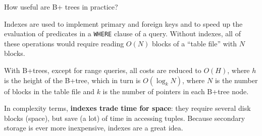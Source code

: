 %
%


%
%
\begin{frame}{How useful are B+ trees in practice?}

Indexes are used to implement primary and foreign keys and to speed up the evaluation of predicates in a \lstinline[style=SQL]{WHERE} clause of a query. Without indexes, all of these operations would require reading $O(N)$ blocks of a ``table file'' with $N$ blocks.

With B+trees, except for range queries, all costs are reduced to $O(H)$, where $h$ is the height of the B+tree, which in turn is $O(\log_k N)$, where $N$ is the number of blocks in the table file and $k$ is the number of pointers in each B+tree node.

In complexity terms, \textbf{indexes trade time for space}: they require several disk blocks (space), but save (a lot) of time in accessing tuples. Because secondary storage is ever more inexpensive, indexes are a great idea.


\end{frame}
